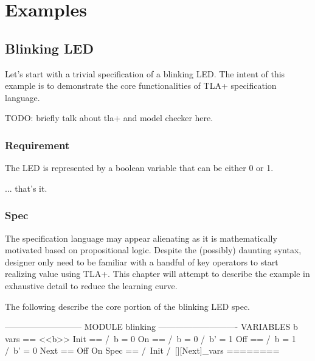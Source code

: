 \documentclass{report}
\begin{document}
\part{Examples}

\chapter{Blinking LED}

Let's start with a trivial specification of a blinking LED. The intent of this example 
is to demonstrate the core functionalities of TLA+ specification language.

TODO: briefly talk about tla+ and model checker here.

\section{Requirement}

The LED is represented by a boolean variable that can be either 0 or 1.\newline

... that's it.

\section{Spec}

The specification language may appear alienating as it is mathematically
motivated based on propositional logic. Despite the (possibly) daunting syntax,
designer only need to be familiar with a handful of key operators to start
realizing value using TLA+. This chapter will attempt to describe the example in
exhaustive detail to reduce the learning curve.

The following describe the core portion of the blinking LED spec. 

\begin{tla}
--------------------------- MODULE blinking ----------------------------
VARIABLES b 
vars == <<b>>
Init ==
    /\ b = 0
On == 
    /\ b = 0
    /\ b' = 1
Off == 
    /\ b = 1
    /\ b' = 0
Next ==
    \/ Off 
    \/ On
Spec ==
    /\ Init
    /\ [][Next]_vars
========
\end{tla}
\begin{tlatex}
\@x{}\moduleLeftDash{}\moduleRightDash\@xx{}%
%
%
%
%
%
%
%
%
%
%
%
%
%
%
%
%
\@x{}\bottombar\@xx{}%
\end{tlatex}
\end{document}
